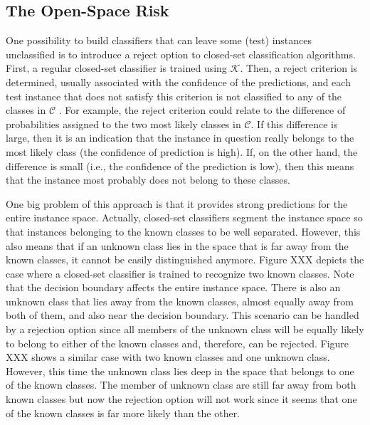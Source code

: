 \subsection{The Open-Space Risk}
\label{chap:openset:sec:open_space_risk}

One possibility to build classifiers that can leave some (test) instances unclassified is to introduce a reject option to closed-set classification algorithms. First, a regular closed-set classifier is trained using $\mathcal{K}$. Then, a reject criterion is determined, usually associated with the confidence of the predictions, and each test instance that does not satisfy this criterion is not classified to any of the classes in $\mathcal{C}$ . For example, the reject criterion could relate to the difference of probabilities assigned to the two most likely classes in $\mathcal{C}$. If this difference is large, then it is an indication that the instance in question really belongs to the most likely class (the confidence of prediction is high). If, on the other hand, the difference is small (i.e., the confidence of the prediction is low), then this means that the instance most probably does not belong to these classes. 

One big problem of this approach is that it provides strong predictions for the entire instance space. Actually, closed-set classifiers segment the instance space so that instances belonging to the known classes to be well separated. However, this also means that if an unknown class lies in the space that is far away from the known classes, it cannot be easily distinguished anymore. Figure XXX depicts the case where a closed-set classifier is trained to recognize two known classes. Note that the decision boundary affects the entire instance space. There is also an unknown class that lies away from the known classes, almost equally away from both of them, and also near the decision boundary. This scenario can be handled by a rejection option since all members of the unknown class will be equally likely to belong to either of the known classes and, therefore, can be rejected. Figure XXX shows a similar case with two known classes and one unknown class. However, this time the unknown class lies deep in the space that belongs to one of the known classes. The member of unknown class are still far away from both known classes but now the rejection option will not work since it seems that one of the known classes is far more likely than the other. 


